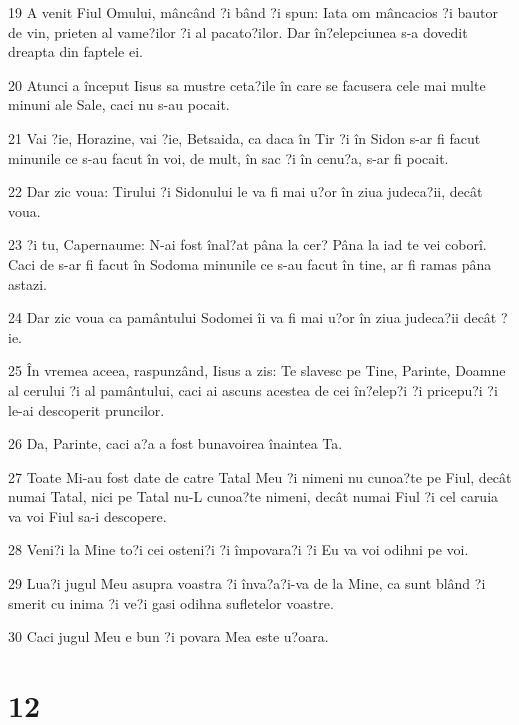 \par 19 A venit Fiul Omului, mâncând ?i bând ?i spun: Iata om mâncacios ?i bautor de vin, prieten al vame?ilor ?i al pacato?ilor. Dar în?elepciunea s-a dovedit dreapta din faptele ei.
\par 20 Atunci a început Iisus sa mustre ceta?ile în care se facusera cele mai multe minuni ale Sale, caci nu s-au pocait.
\par 21 Vai ?ie, Horazine, vai ?ie, Betsaida, ca daca în Tir ?i în Sidon s-ar fi facut minunile ce s-au facut în voi, de mult, în sac ?i în cenu?a, s-ar fi pocait.
\par 22 Dar zic voua: Tirului ?i Sidonului le va fi mai u?or în ziua judeca?ii, decât voua.
\par 23 ?i tu, Capernaume: N-ai fost înal?at pâna la cer? Pâna la iad te vei coborî. Caci de s-ar fi facut în Sodoma minunile ce s-au facut în tine, ar fi ramas pâna astazi.
\par 24 Dar zic voua ca pamântului Sodomei îi va fi mai u?or în ziua judeca?ii decât ?ie.
\par 25 În vremea aceea, raspunzând, Iisus a zis: Te slavesc pe Tine, Parinte, Doamne al cerului ?i al pamântului, caci ai ascuns acestea de cei în?elep?i ?i pricepu?i ?i le-ai descoperit pruncilor.
\par 26 Da, Parinte, caci a?a a fost bunavoirea înaintea Ta.
\par 27 Toate Mi-au fost date de catre Tatal Meu ?i nimeni nu cunoa?te pe Fiul, decât numai Tatal, nici pe Tatal nu-L cunoa?te nimeni, decât numai Fiul ?i cel caruia va voi Fiul sa-i descopere.
\par 28 Veni?i la Mine to?i cei osteni?i ?i împovara?i ?i Eu va voi odihni pe voi.
\par 29 Lua?i jugul Meu asupra voastra ?i înva?a?i-va de la Mine, ca sunt blând ?i smerit cu inima ?i ve?i gasi odihna sufletelor voastre.
\par 30 Caci jugul Meu e bun ?i povara Mea este u?oara.

\chapter{12}

